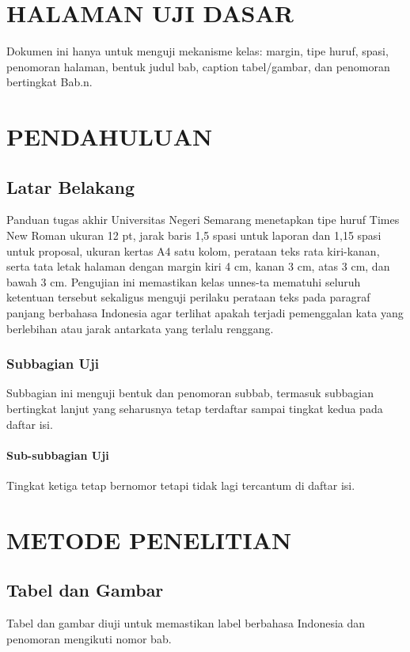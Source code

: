 \documentclass[jenis=skripsi,mode=laporan,jenjang=sarjana,sitasi=apa,logo=logo-placeholder]{unnes-ta}
\begin{document}
\bagianawal
\chapter*{HALAMAN UJI DASAR}
Dokumen ini hanya untuk menguji mekanisme kelas: margin, tipe huruf, spasi, penomoran
halaman, bentuk judul bab, caption tabel/gambar, dan penomoran bertingkat Bab.n.

\tableofcontents

\bagianutama
\chapter{PENDAHULUAN}
\section{Latar Belakang}
Panduan tugas akhir Universitas Negeri Semarang menetapkan tipe huruf Times New Roman
ukuran 12 pt, jarak baris 1,5 spasi untuk laporan dan 1,15 spasi untuk proposal,
ukuran kertas A4 satu kolom, perataan teks rata kiri-kanan, serta tata letak halaman
dengan margin kiri 4 cm, kanan 3 cm, atas 3 cm, dan bawah 3 cm. Pengujian ini memastikan
kelas unnes-ta mematuhi seluruh ketentuan tersebut sekaligus menguji perilaku perataan
teks pada paragraf panjang berbahasa Indonesia agar terlihat apakah terjadi pemenggalan
kata yang berlebihan atau jarak antarkata yang terlalu renggang.

\subsection{Subbagian Uji}
Subbagian ini menguji bentuk dan penomoran subbab, termasuk subbagian bertingkat lanjut
yang seharusnya tetap terdaftar sampai tingkat kedua pada daftar isi.

\subsubsection{Sub-subbagian Uji}
Tingkat ketiga tetap bernomor tetapi tidak lagi tercantum di daftar isi.

\chapter{METODE PENELITIAN}
\section{Tabel dan Gambar}
Tabel dan gambar diuji untuk memastikan label berbahasa Indonesia dan penomoran mengikuti
nomor bab.
\end{document}
